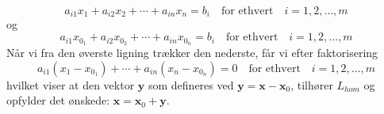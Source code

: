 \begin{bevis}
\begin{enumerate}
\begin{equation}
a_{i1}x_{1}+ a_{i2}x_{2}+\cdots + a_{in}x_{n}=b_i \quad \textrm{for ethvert} \quad i=1,2,\ldots,m
\end{equation}
og
\begin{equation}
a_{i1}x_{0_1}+a_{i2}x_{0_2}+\cdots + a_{in}x_{0_n}=b_i \quad \textrm{for ethvert} \quad i=1,2,\ldots,m
\end{equation}
Når vi fra den øverste ligning trækker den nederste, får vi efter faktorisering
\begin{equation}
a_{i1}(x_1-x_{0_1})+\cdots + a_{in}(x_n-x_{0_n})=0 \quad \textrm{for ethvert} \quad i=1,2,\ldots,m
\end{equation}
hvilket viser at den vektor $\mathbf y$ som defineres ved $\mathbf y=\mathbf x -\mathbf x_0$, tilhører $L_{hom}$ og opfylder det ønskede: $\mathbf x=\mathbf x_0+\mathbf y$. 
\end{enumerate}
\end{bevis}


